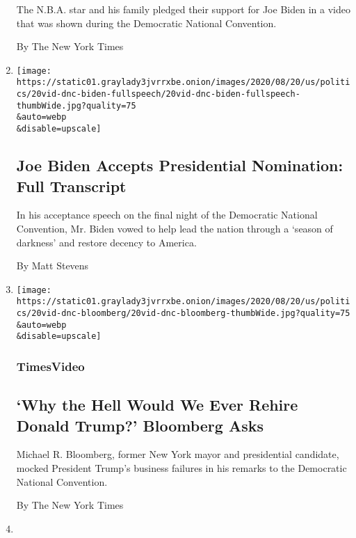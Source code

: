 \begin{enumerate}
  The N.B.A. star and his family pledged their support for Joe Biden in
  a video that was shown during the Democratic National Convention.

  By The New York Times
\item
  \href{/2020/08/20/us/politics/biden-presidential-nomination-dnc.html}{}

  \texttt{[image: https://static01.graylady3jvrrxbe.onion/images/2020/08/20/us/politics/20vid-dnc-biden-fullspeech/20vid-dnc-biden-fullspeech-thumbWide.jpg?quality=75\\\&auto=webp\\\&disable=upscale]}

  \hypertarget{joe-biden-accepts-presidential-nomination-full-transcript}{%
  \subsection{Joe Biden Accepts Presidential Nomination: Full
  Transcript}\label{joe-biden-accepts-presidential-nomination-full-transcript}}

  In his acceptance speech on the final night of the Democratic National
  Convention, Mr. Biden vowed to help lead the nation through a `season
  of darkness' and restore decency to America.

  By Matt Stevens
\item
  \href{/video/us/elections/100000007299747/michael-bloomberg-speaks-dnc.html}{}

  \texttt{[image: https://static01.graylady3jvrrxbe.onion/images/2020/08/20/us/politics/20vid-dnc-bloomberg/20vid-dnc-bloomberg-thumbWide.jpg?quality=75\\\&auto=webp\\\&disable=upscale]}

  \hypertarget{timesvideo-2}{%
  \subsubsection{TimesVideo}\label{timesvideo-2}}

  \hypertarget{why-the-hell-would-we-ever-rehire-donald-trump-bloomberg-asks}{%
  \subsection{`Why the Hell Would We Ever Rehire Donald Trump?'
  Bloomberg
  Asks}\label{why-the-hell-would-we-ever-rehire-donald-trump-bloomberg-asks}}

  Michael R. Bloomberg, former New York mayor and presidential
  candidate, mocked President Trump's business failures in his remarks
  to the Democratic National Convention.

  By The New York Times
\item
  \href{/2020/08/20/us/politics/Joe-Biden-accepts-democratic-nomination.html}{}


\end{enumerate}

